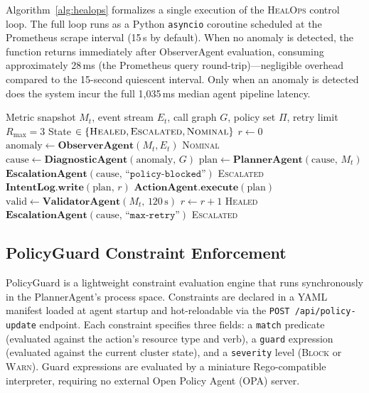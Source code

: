 \documentclass[journal,10pt,twoside]{IEEEtran}
\newcommand{\HealOps}{\textsc{HealOps}}
\begin{document}
Algorithm~\ref{alg:healops} formalizes a single execution of the \HealOps{}
control loop. The full loop runs as a Python \texttt{asyncio} coroutine
scheduled at the Prometheus scrape interval (15\,s by default).
When no anomaly is detected, the function returns immediately after
ObserverAgent evaluation, consuming approximately 28\,ms (the Prometheus
query round-trip)---negligible overhead compared to the 15-second quiescent
interval. Only when an anomaly is detected does the system incur the
full 1,035\,ms median agent pipeline latency.

\begin{algorithm}[!t]
\caption{One \HealOps{} Control Tick}
\label{alg:healops}
\begin{algorithmic}[1]
\REQUIRE Metric snapshot $M_t$, event stream $E_t$, call graph $G$,
         policy set $\Pi$, retry limit $R_{\max} = 3$
\ENSURE  State $\in \{\textsc{Healed}, \textsc{Escalated}, \textsc{Nominal}\}$
\STATE $r \leftarrow 0$
\STATE $\text{anomaly} \leftarrow \textbf{ObserverAgent}(M_t, E_t)$
  \RETURN \textsc{Nominal}
\ENDIF
\STATE $\text{cause} \leftarrow \textbf{DiagnosticAgent}(\text{anomaly},\, G)$
\STATE $\text{plan} \leftarrow \textbf{PlannerAgent}(\text{cause},\, M_t)$
  \STATE $\textbf{EscalationAgent}(\text{cause},\, \texttt{``policy-blocked''})$
  \RETURN \textsc{Escalated}
\ENDIF
\REPEAT
  \STATE $\textbf{IntentLog.write}(\text{plan},\, r)$
  \STATE $\textbf{ActionAgent.execute}(\text{plan})$
  \STATE $\text{valid} \leftarrow \textbf{ValidatorAgent}(M_t,\, 120\,\text{s})$
  \STATE $r \leftarrow r + 1$
  \RETURN \textsc{Healed}
\ELSE
  \STATE $\textbf{EscalationAgent}(\text{cause},\, \texttt{``max-retry''})$
  \RETURN \textsc{Escalated}
\ENDIF
\end{algorithmic}
\end{algorithm}

\subsection{PolicyGuard Constraint Enforcement}

PolicyGuard is a lightweight constraint evaluation engine that runs
synchronously in the PlannerAgent's process space. Constraints are
declared in a YAML manifest loaded at agent startup and hot-reloadable
via the \texttt{POST /api/policy-update} endpoint. Each constraint
specifies three fields: a \texttt{match} predicate (evaluated against
the action's resource type and verb), a \texttt{guard} expression
(evaluated against the current cluster state), and a \texttt{severity}
level (\textsc{Block} or \textsc{Warn}). Guard expressions are evaluated
by a miniature Rego-compatible interpreter, requiring no external
Open Policy Agent (OPA) server.
\end{document}
